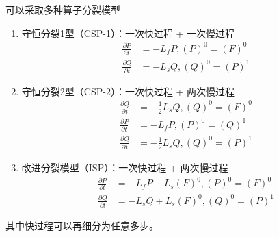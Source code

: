 \documentclass{ctexart}
\begin{document}
可以采取多种算子分裂模型
\begin{enumerate}
\item 守恒分裂1型（CSP-1）：一次快过程 + 一次慢过程
\begin{align}
  \frac{\partial P}{\partial t} & = - L_f P, (P)^0 = (F)^0 \\
  \frac{\partial Q}{\partial t} & = - L_s Q, (Q)^0 = (P)^1
\end{align}
\item 守恒分裂2型（CSP-2）：一次快过程 + 两次慢过程
\begin{align}
  \frac{\partial Q}{\partial t} & = - \frac{1}{2} L_s Q, (Q)^0 = (F)^0 \\
  \frac{\partial P}{\partial t} & = - L_f P, (P)^0 = (Q)^1 \\
  \frac{\partial Q}{\partial t} & = - \frac{1}{2} L_s Q, (Q)^0 = (P)^1
\end{align}
\item 改进分裂模型（ISP）：一次快过程 + 两次慢过程
\begin{align}
  \frac{\partial P}{\partial t} & = - L_f P - L_s (F)^0, (P)^0 = (F)^0 \\
  \frac{\partial Q}{\partial t} & = - L_s Q + L_s (F)^0, (Q)^0 = (P)^1
\end{align}
\end{enumerate}
其中快过程可以再细分为任意多步。
\end{document}
